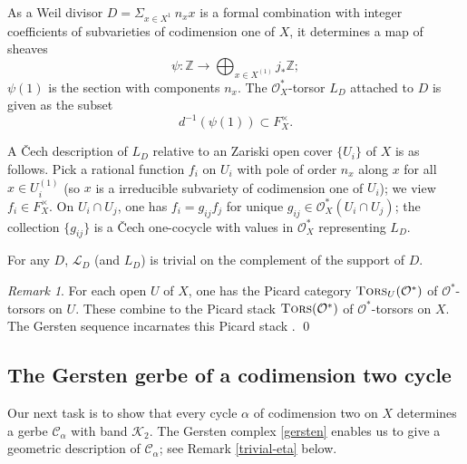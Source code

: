 \documentclass{amsart}
\numberwithin{equation}{subsection}
\theoremstyle{remark}
\newtheorem{remark}[theorem]{Remark}
\theoremstyle{remark}
\newcommand{\too}{\longrightarrow}%
\newcommand{\cC}{\mathcal{C}}
\newcommand{\cK}{\mathcal{K}}
\newcommand{\cL}{\mathcal{L}}
\newcommand{\cO}{\mathcal{O}}
\newcommand{\bbZ}{\mathbb{Z}}
\DeclareMathOperator{\tors}{\textsc{Tors}} %
\begin{document}
 As a Weil divisor $D = \Sigma_{x\in X^1}~ n_x x$ is a formal combination with integer coefficients of subvarieties of codimension one of $X$, it determines a map of sheaves
 \begin{equation*}
   \psi\colon \bbZ \too \bigoplus_{x \in X^{(1)}} j_*\bbZ;
 \end{equation*}
 $\psi(1)$ is the section with components $n_x$. The $\cO_X^*$-torsor $L_D$ attached to $D$ is given as the subset
\begin{equation}\label{divisore}
{d}^{-1}(\psi(1)) \subset F_X^{\times}.
\end{equation}

 A \v Cech description of $L_D$ relative to an Zariski open cover $\{U_i\}$ of $X$ is as follows. Pick a rational function $f_i$ on $U_i$ with pole of order $n_x$ along $x$ for all $x \in U^{(1)}_i$ (so $x$ is a irreducible subvariety of codimension one of $U_i$); we view $f_i \in F_X^{\times}$. On $U_i \cap U_j$, one has $f_i = g_{ij}f_j$ for unique $g_{ij} \in \cO_X^*(U_i \cap U_j)$; the collection $\{g_{ij}\}$ is a \v Cech one-cocycle with values in $\cO_X^*$ representing $L_D$. 

For any $D$, $\cL_D$ (and $L_D$) is trivial on the complement of the support of $D$.

\begin{remark}\label{picard}
  For each open $U$ of $X$, one has the  Picard category $\tors_U(\cO^*)$ of $\cO^*$-torsors on $U$. These combine to the Picard stack $\tors(\cO^*)$ of $\cO^*$-torsors 
on $X$.  The Gersten sequence incarnates this Picard stack \cite[1.10]{DeligneB}. \qed
\end{remark}

 
\subsection{The Gersten gerbe of a codimension two cycle} 
 Our next task is to show  that every cycle $\alpha$ of codimension two on $X$ determines a gerbe $\cC_{\alpha}$ with band $\cK_2$.  The Gersten complex \eqref{gersten} enables us to give a geometric description of $\cC_{\alpha}$; see Remark \ref{trivial-eta} below. 
 
\end{document}
